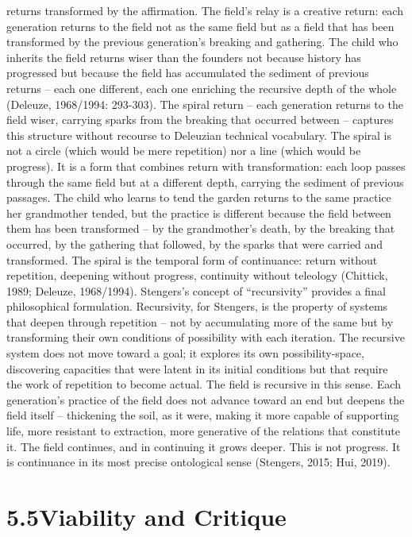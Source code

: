 returns transformed by the affirmation. The field’s relay is a creative return: each generation returns to the field not as the same field but as a field that has been transformed by the previous generation’s breaking and gathering. The child who inherits the field returns wiser than the founders not because history has progressed but because the field has accumulated the sediment of previous returns – each one different, each one enriching the recursive depth of the whole (Deleuze, 1968/1994: 293-303). The spiral return – each generation returns to the field wiser, carrying sparks from the breaking that occurred between – captures this structure without recourse to Deleuzian technical vocabulary. The spiral is not a circle (which would be mere repetition) nor a line (which would be progress). It is a form that combines return with transformation: each loop passes through the same field but at a different depth, carrying the sediment of previous passages. The child who learns to tend the garden returns to the same practice her grandmother tended, but the practice is different because the field between them has been transformed – by the grandmother’s death, by the breaking that occurred, by the gathering that followed, by the sparks that were carried and transformed. The spiral is the temporal form of continuance: return without repetition, deepening without progress, continuity without teleology (Chittick, 1989; Deleuze, 1968/1994). Stengers’s concept of “recursivity” provides a final philosophical formulation. Recursivity, for Stengers, is the property of systems that deepen through repetition – not by accumulating more of the same but by transforming their own conditions of possibility with each iteration. The recursive system does not move toward a goal; it explores its own possibility-space, discovering capacities that were latent in its initial conditions but that require the work of repetition to become actual. The field is recursive in this sense. Each generation’s practice of the field does not advance toward an end but deepens the field itself – thickening the soil, as it were, making it more capable of supporting life, more resistant to extraction, more generative of the relations that constitute it. The field continues, and in continuing it grows deeper. This is not progress. It is continuance in its most precise ontological sense (Stengers, 2015; Hui, 2019).

\section{5.5\quad Viability and Critique}


